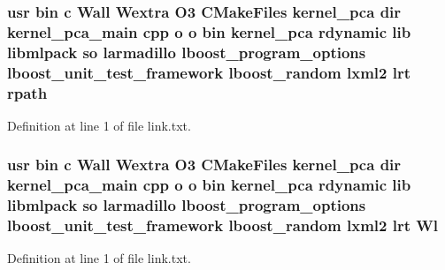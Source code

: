 \subsubsection[{rpath}]{\setlength{\rightskip}{0pt plus 5cm}usr bin c Wall Wextra O3 C\-Make\-Files kernel\-\_\-pca dir kernel\-\_\-pca\-\_\-main cpp o o bin kernel\-\_\-pca rdynamic lib libmlpack so larmadillo lboost\-\_\-program\-\_\-options lboost\-\_\-unit\-\_\-test\-\_\-framework lboost\-\_\-random lxml2 lrt rpath}\label{methods_2kernel__pca_2CMakeFiles_2kernel__pca_8dir_2link_8txt_af05ecf93cb9825bd3c597da7fcc27ae8}


Definition at line 1 of file link.\-txt.

\subsubsection[{Wl}]{\setlength{\rightskip}{0pt plus 5cm}usr bin c Wall Wextra O3 C\-Make\-Files kernel\-\_\-pca dir kernel\-\_\-pca\-\_\-main cpp o o bin kernel\-\_\-pca rdynamic lib libmlpack so larmadillo lboost\-\_\-program\-\_\-options lboost\-\_\-unit\-\_\-test\-\_\-framework lboost\-\_\-random lxml2 lrt Wl}\label{methods_2kernel__pca_2CMakeFiles_2kernel__pca_8dir_2link_8txt_a4bba238e5cb332c47c0b3ef1b928e955}


Definition at line 1 of file link.\-txt.


